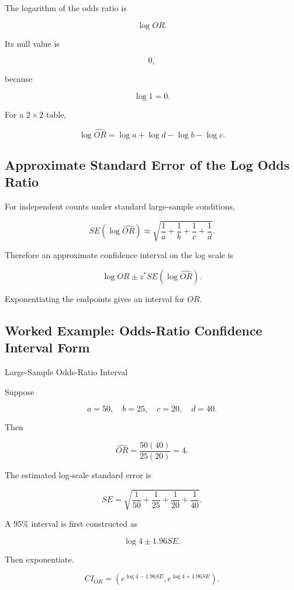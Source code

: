 The logarithm of the odds ratio is

\[
\boxed{
\log OR.
}
\]

Its null value is

\[
\boxed{
0,
}
\]

because

\[
\log 1=0.
\]

For a \(2\times2\) table,

\[
\boxed{
\log\widehat{OR}
=
\log a
+
\log d
-
\log b
-
\log c.
}
\]

\subsection{Approximate Standard Error of the Log Odds Ratio}
\label{subsec:se-log-odds-ratio}

For independent counts under standard large-sample conditions,

\[
\boxed{
SE
(
\log\widehat{OR}
)
\approx
\sqrt{
\frac1a
+
\frac1b
+
\frac1c
+
\frac1d
}.
}
\]

Therefore an approximate confidence interval on the log scale is

\[
\boxed{
\log\widehat{OR}
\pm
z^*
SE
(
\log\widehat{OR}
).
}
\]

Exponentiating the endpoints gives an interval for \(OR\).

\subsection{Worked Example: Odds-Ratio Confidence Interval Form}
\label{subsec:worked-or-ci}

\begin{workedexamplebox}{Large-Sample Odds-Ratio Interval}

Suppose

\[
a=50,
\quad
b=25,
\quad
c=20,
\quad
d=40.
\]

Then

\[
\widehat{OR}
=
\frac{
50(40)
}{
25(20)
}
=
4.
\]

The estimated log-scale standard error is

\[
SE
=
\sqrt{
\frac1{50}
+
\frac1{25}
+
\frac1{20}
+
\frac1{40}
}.
\]

A \(95\%\) interval is first constructed as

\[
\log4
\pm
1.96SE.
\]

Then exponentiate.

\begin{answerbox}
\[
\boxed{
CI_{OR}
=
\left(
e^{\log4-1.96SE},
e^{\log4+1.96SE}
\right).
}
\]
\end{answerbox}

\end{workedexamplebox}

